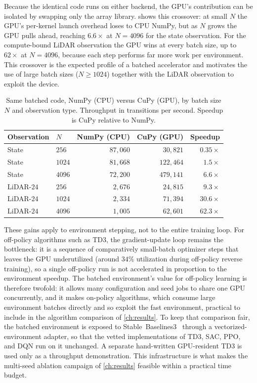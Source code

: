 Because the identical code runs on either backend, the GPU's contribution can be isolated by swapping only the array library.  shows this crossover: at small $N$ the GPU's per-kernel launch overhead loses to CPU NumPy, but as $N$ grows the GPU pulls ahead, reaching $6.6\times$ at $N=4096$ for the state observation. For the compute-bound LiDAR observation the GPU wins at every batch size, up to $62\times$ at $N=4096$, because each step performs far more work per environment. This crossover is the expected profile of a batched accelerator and motivates the use of large batch sizes ($N \geq 1024$) together with the LiDAR observation to exploit the device.

\begin{table}[H]
\centering
\caption{Same batched code, NumPy (CPU) versus CuPy (GPU), by batch size $N$ and observation type. Throughput in transitions per second. Speedup is CuPy relative to NumPy.}
\label{tab:numpy_cupy}
\begin{tabular}{llrrr}
\toprule
Observation & $N$ & NumPy (CPU) & CuPy (GPU) & Speedup \\
\midrule
State      & $256$  & $87{,}060$ & $30{,}821$  & $0.35\times$ \\
State      & $1024$ & $81{,}668$ & $122{,}464$ & $1.5\times$ \\
State      & $4096$ & $72{,}200$ & $479{,}141$ & $6.6\times$ \\
LiDAR-$24$ & $256$  & $2{,}676$  & $24{,}815$  & $9.3\times$ \\
LiDAR-$24$ & $1024$ & $2{,}334$  & $71{,}394$  & $30.6\times$ \\
LiDAR-$24$ & $4096$ & $1{,}005$  & $62{,}601$  & $62.3\times$ \\
\bottomrule
\end{tabular}
\end{table}

These gains apply to environment stepping, not to the entire training loop. For off-policy algorithms such as TD3, the gradient-update loop remains the bottleneck: it is a sequence of comparatively small-batch optimizer steps that leaves the GPU underutilized (around $34\%$ utilization during off-policy reverse training), so a single off-policy run is not accelerated in proportion to the environment speedup. The batched environment's value for off-policy learning is therefore twofold: it allows many configuration and seed jobs to share one GPU concurrently, and it makes on-policy algorithms, which consume large environment batches directly and so exploit the fast environment, practical to include in the algorithm comparison of \cref{ch:results}. To keep that comparison fair, the batched environment is exposed to Stable~Baselines3~\cite{raffin2021sb3} through a vectorized-environment adapter, so that the vetted implementations of TD3, SAC, PPO, and DQN run on it unchanged. A separate hand-written GPU-resident TD3 is used only as a throughput demonstration. This infrastructure is what makes the multi-seed ablation campaign of \cref{ch:results} feasible within a practical time budget.

